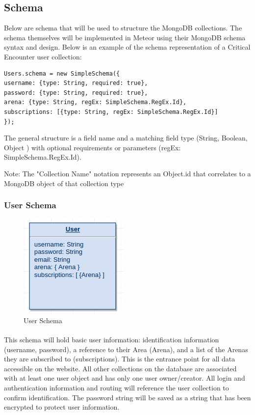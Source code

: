 \documentclass[12pt,a4paper]{report}
\begin{document}
\subsection{Schema}
Below are schema that will be used to structure the MongoDB collections. The schema themselves will be implemented in Meteor using their MongoDB schema syntax and design.\cite{meteorappstructure} Below is an example of the schema representation of a Critical Encounter user collection:

\begin{lstlisting}
Users.schema = new SimpleSchema({
username: {type: String, required: true},
password: {type: String, required: true},
arena: {type: String, regEx: SimpleSchema.RegEx.Id},
subscriptions: [{type: String, regEx: SimpleSchema.RegEx.Id}]
});
\end{lstlisting}

The general structure is a field name and a matching field type (String, Boolean, Object ) with optional requirements or parameters (regEx: SimpleSchema.RegEx.Id).

Note: The { "Collection Name" } notation represents an Object.id that correlates to a MongoDB object of that collection type
\subsubsection{User Schema}
\begin{figure}[H]
	\centering
	\includegraphics[scale=.75]{schema-user}
	\caption{User Schema}
	\label{fig: User Schema }
\end{figure}

\paragraph{}This schema will hold basic user information: identification information (username, password), a reference to their Area (Arena), and a list of the Arenas they are subscribed to (subscriptions). This is the entrance point for all data accessible on the website. All other collections on the database are associated with at least one user object and has only one user owner/creator. All login and authentication information and routing will reference the user collection to confirm identification. The password string will be saved as a string that has been encrypted to protect user information.
\end{document}
